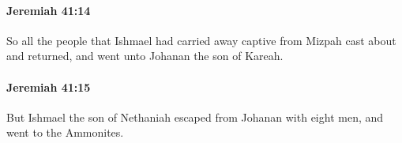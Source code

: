 		\paragraph{Jeremiah 41:14} %
			\label{JEREMIAH-41-14}

			So all the people that Ishmael had carried away captive from Mizpah cast about and returned, and went unto Johanan the son of Kareah.


		\paragraph{Jeremiah 41:15} %
			\label{JEREMIAH-41-15}

			But Ishmael the son of Nethaniah escaped from Johanan with eight men, and went to the Ammonites.


